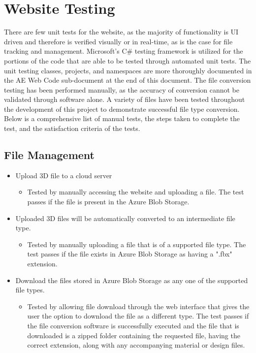 
\section{Website Testing}
\tab There are few unit tests for the website, as the majority of functionality is UI driven and therefore is verified visually or in real-time, as is the case for file tracking and management. 
Microsoft's C\# testing framework is utilized for the portions of the code that are able to be tested through automated unit tests. 
The unit testing classes, projects, and namespaces are more thoroughly documented in the AE Web Code sub-document at the end of this document.
The file conversion testing has been performed manually, as the accuracy of conversion cannot be validated through software alone. 
A variety of files have been tested throughout the development of this project to demonstrate successful file type conversion.
Below is a comprehensive list of manual tests, the steps taken to complete the test, and the satisfaction criteria of the tests.

\subsection{File Management}
\begin{itemize}
    \item Upload 3D file to a cloud server 
    \begin{itemize}
        \item Tested by manually accessing the website and uploading a file. The test passes if the file is present in the Azure Blob Storage.
    \end{itemize}

    \item Uploaded 3D files will be automatically converted to an intermediate file type.
    \begin{itemize}
        \item Tested by manually uploading a file that is of a supported file type. The test passes if the file exists in Azure Blob Storage as having a ".fbx" extension.
    \end{itemize} 

    \item Download the files stored in Azure Blob Storage as any one of the supported file types.
    \begin{itemize}
        \item Tested by allowing file download through the web interface that gives the user the option to download the file as a different type. The test passes if the file conversion software is successfully executed and the file that is downloaded is a zipped folder containing the requested file, having the correct extension, along with any accompanying material or design files.
    \end{itemize}  

\end{itemize}


